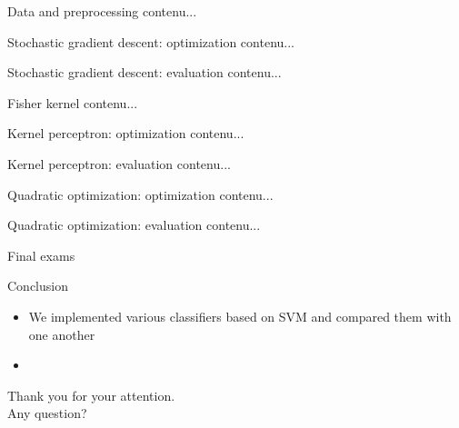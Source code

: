 \documentclass[10pt]{beamer}
\begin{document}
\begin{frame}{Data and preprocessing}
contenu...
\end{frame}

\begin{frame}{Stochastic gradient descent: optimization}
contenu...
\end{frame}

\begin{frame}{Stochastic gradient descent: evaluation}
contenu...
\end{frame}

\begin{frame}{Fisher kernel}
contenu...
\end{frame}

\begin{frame}{Kernel perceptron: optimization}
contenu...
\end{frame}

\begin{frame}{Kernel perceptron: evaluation}
contenu...
\end{frame}

\begin{frame}{Quadratic optimization: optimization}
contenu...
\end{frame}

\begin{frame}{Quadratic optimization: evaluation}
contenu...
\end{frame}

\begin{frame}{Final exams}

\end{frame}

\begin{frame}{Conclusion}
  \begin{itemize}
    \item We implemented various classifiers based on SVM and compared them with one another
    \item
  \end{itemize}
\end{frame}

\begin{frame}
\fontsize{15}{17}\selectfont
\begin{center}
Thank you for your attention. \\
\vspace{.4in}
Any question?
\end{center}
\end{frame}
\end{document}
